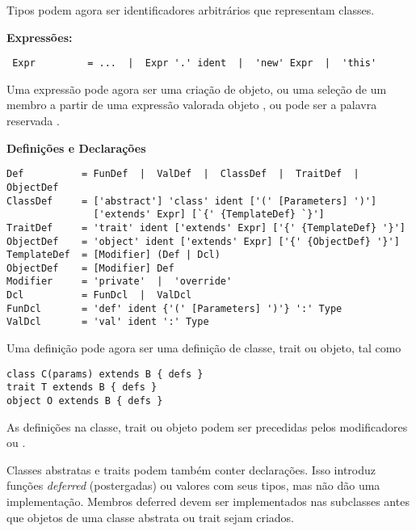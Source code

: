 Tipos podem agora ser identificadores arbitr\'{a}rios que representam classes.

\textbf{Express\~{o}es:}
 \begin{lstlisting}
 Expr         = ...  |  Expr '.' ident  |  'new' Expr  |  'this'
 \end{lstlisting}

Uma express\~{a}o pode agora ser uma cria\c{c}\~{a}o de objeto, ou uma sele\c{c}\~{a}o
 de um membro  a partir de uma express\~{a}o valorada objeto ,
ou pode ser a palavra reservada .

 \textbf{Defini\c{c}\~{o}es e Declara\c{c}\~{o}es}
\begin{lstlisting}
Def          = FunDef  |  ValDef  |  ClassDef  |  TraitDef  |  ObjectDef
ClassDef     = ['abstract'] 'class' ident ['(' [Parameters] ')'] 
               ['extends' Expr] [`{' {TemplateDef} `}']
TraitDef     = 'trait' ident ['extends' Expr] ['{' {TemplateDef} '}']
ObjectDef    = 'object' ident ['extends' Expr] ['{' {ObjectDef} '}']
TemplateDef  = [Modifier] (Def | Dcl)
ObjectDef    = [Modifier] Def
Modifier     = 'private'  |  'override'
Dcl          = FunDcl  |  ValDcl
FunDcl       = 'def' ident {'(' [Parameters] ')'} ':' Type
ValDcl       = 'val' ident ':' Type
\end{lstlisting}

Uma defini\c{c}\~{a}o pode agora ser uma defini\c{c}\~{a}o de classe, trait ou objeto, tal como  
\begin{lstlisting}
class C(params) extends B { defs }
trait T extends B { defs }
object O extends B { defs }
\end{lstlisting}
As defini\c{c}\~{o}es  na classe, trait ou objeto podem ser 
precedidas pelos modificadores  ou .

Classes abstratas e traits podem tamb\'{e}m conter declara\c{c}\~{o}es. Isso introduz
fun\c{c}\~{o}es {\em deferred} (postergadas) ou valores com seus tipos, mas n\~{a}o 
d\~{a}o uma implementa\c{c}\~{a}o. Membros deferred devem ser implementados nas subclasses 
antes que objetos de uma classe abstrata ou trait sejam criados. 


